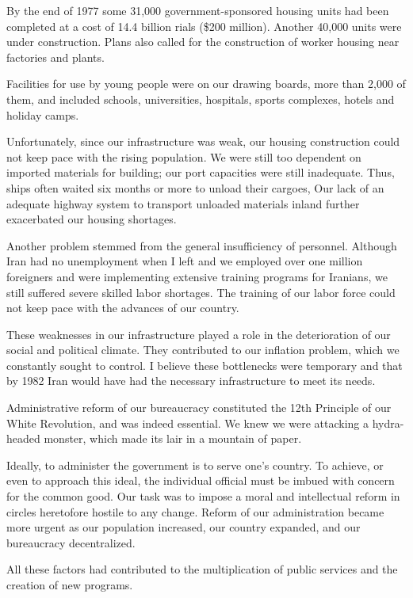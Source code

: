 By the end of 1977 some 31,000 government-sponsored housing units had been completed at a cost of 14.4 billion rials (\$200 million). Another 40,000 units were under construction. Plans also called for the construction of worker housing near factories and plants. 


Facilities for use by young people were on our drawing boards, more than 2,000 of them, and included schools, universities, hospitals, sports complexes, hotels and holiday camps. 

Unfortunately, since our infrastructure was weak, our housing construction could not keep pace with the rising population. We were still too dependent on imported materials for building; our port capacities were still inadequate. Thus, ships often waited six months or more to unload their cargoes, Our lack of an adequate highway system to transport unloaded materials inland further exacerbated our housing shortages. 

Another problem stemmed from the general insufficiency of personnel. Although Iran had no unemployment when I left and we employed over one million foreigners and were implementing extensive training programs for Iranians, we still suffered severe skilled labor shortages. The training of our labor force could not keep pace with the advances of our country. 

These weaknesses in our infrastructure played a role in the deterioration of our social and political climate. They contributed to our inflation problem, which we constantly sought to control. I believe these bottlenecks were temporary and that by 1982 Iran would have had the necessary infrastructure to meet its needs. 


Administrative reform of our bureaucracy constituted the 12th Principle of our White Revolution, and was indeed essential. We knew we were attacking a hydra-headed monster, which made its lair in a mountain of paper. 

Ideally, to administer the government is to serve one’s country. To achieve, or even to approach this ideal, the individual official must be imbued with concern for the common good. Our task was to impose a moral and intellectual reform in circles heretofore hostile to any change. Reform of our administration became more urgent as our population increased, our country expanded, and our bureaucracy decentralized. 

All these factors had contributed to the multiplication of public services and the creation of new programs. 

